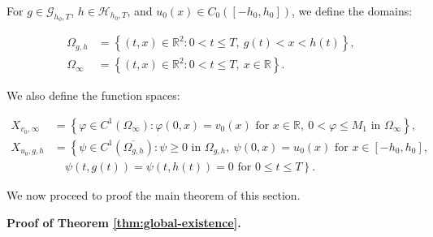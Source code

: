 \documentclass[a4paper,11pt]{amsart}
\theoremstyle{definition}
\numberwithin{equation}{section}
\theoremstyle{definition}
\begin{document}
For \( g \in \mathcal{G}_{h_0,T} \), \( h \in \mathcal{H}_{h_0,T} \), and \( u_0(x) \in C_0([{-}h_0,h_0]) \), we define the domains:

\begin{align*}
\Omega_{g,h} &= \left\{ (t,x) \in \mathbb{R}^2 : 0 < t \leq T, \ g(t) < x < h(t) \right\}, \\
\Omega_\infty &= \left\{ (t,x) \in \mathbb{R}^2 : 0 < t \leq T, \ x \in \mathbb{R} \right\}.
\end{align*}

We also define the function spaces:

\begin{align*}
X_{v_0,\infty} &= \left\{ \varphi \in C^1(\Omega_\infty) : \varphi(0,x) = v_0(x) \text{ for } x \in \mathbb{R}, \ 0 < \varphi \leq M_1 \text{ in } \Omega_\infty \right\}, \\
X_{u_0,g,h} &= \left\{ \psi \in C^1(\overline{\Omega_{g,h}}) : \psi \geq 0 \text{ in } \Omega_{g,h}, \ \psi(0,x) = u_0(x) \text{ for } x \in [-h_0,h_0], \right. \\
&\quad \left. \psi(t,g(t)) = \psi(t,h(t)) = 0 \text{ for } 0 \leq t \leq T \right\}.
\end{align*}


We now proceed to proof the main theorem of this section.

\textbf{Proof of Theorem \ref{thm:global-existence}.}
\end{document}
